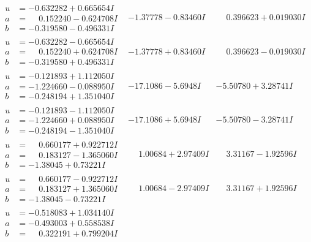 \documentclass[1p]{elsarticle_modified}
\theoremstyle{definition}
\begin{document}
$$\begin{array}{c|c|c}
\begin{aligned}
u &= -0.632282 + 0.665654 I \\
a &= \phantom{-}0.152240 - 0.624708 I \\
b &= -0.319580 - 0.496331 I\end{aligned}
 & -1.37778 - 0.83460 I & \phantom{-}0.396623 + 0.019030 I \\ \hline\begin{aligned}
u &= -0.632282 - 0.665654 I \\
a &= \phantom{-}0.152240 + 0.624708 I \\
b &= -0.319580 + 0.496331 I\end{aligned}
 & -1.37778 + 0.83460 I & \phantom{-}0.396623 - 0.019030 I \\ \hline\begin{aligned}
u &= -0.121893 + 1.112050 I \\
a &= -1.224660 - 0.088950 I \\
b &= -0.248194 + 1.351040 I\end{aligned}
 & -17.1086 - 5.6948 I & -5.50780 + 3.28741 I \\ \hline\begin{aligned}
u &= -0.121893 - 1.112050 I \\
a &= -1.224660 + 0.088950 I \\
b &= -0.248194 - 1.351040 I\end{aligned}
 & -17.1086 + 5.6948 I & -5.50780 - 3.28741 I \\ \hline\begin{aligned}
u &= \phantom{-}0.660177 + 0.922712 I \\
a &= \phantom{-}0.183127 - 1.365060 I \\
b &= -1.38045 + 0.73221 I\end{aligned}
 & \phantom{-}1.00684 + 2.97409 I & \phantom{-}3.31167 - 1.92596 I \\ \hline\begin{aligned}
u &= \phantom{-}0.660177 - 0.922712 I \\
a &= \phantom{-}0.183127 + 1.365060 I \\
b &= -1.38045 - 0.73221 I\end{aligned}
 & \phantom{-}1.00684 - 2.97409 I & \phantom{-}3.31167 + 1.92596 I \\ \hline\begin{aligned}
u &= -0.518083 + 1.034140 I \\
a &= -0.493003 + 0.558538 I \\
b &= \phantom{-}0.322191 + 0.799204 I\end{aligned}

\end{array}$$
\end{document}
